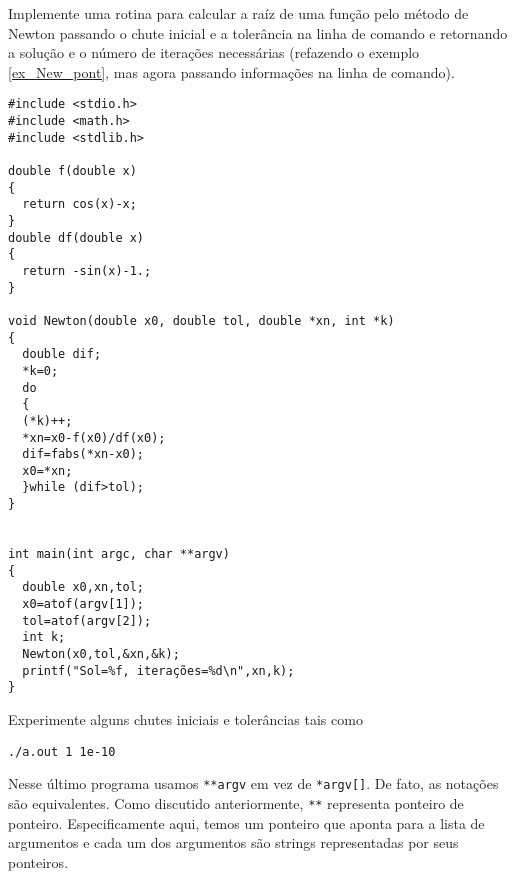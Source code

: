 \begin{ex}Implemente uma rotina para calcular a raíz de uma função pelo método de Newton passando o chute inicial e a tolerância na linha de comando e retornando a solução e o número de iterações necessárias (refazendo o exemplo \ref{ex_New_pont}, mas agora passando informações na linha de comando).
\end{ex}
\begin{verbatim}
#include <stdio.h>
#include <math.h>
#include <stdlib.h>

double f(double x)
{
  return cos(x)-x;
}
double df(double x)
{
  return -sin(x)-1.;
}

void Newton(double x0, double tol, double *xn, int *k)
{
  double dif;
  *k=0;
  do
  {
  (*k)++;
  *xn=x0-f(x0)/df(x0);
  dif=fabs(*xn-x0);
  x0=*xn;
  }while (dif>tol);
}


int main(int argc, char **argv)
{
  double x0,xn,tol;
  x0=atof(argv[1]);
  tol=atof(argv[2]);
  int k;
  Newton(x0,tol,&xn,&k);
  printf("Sol=%f, iterações=%d\n",xn,k);
}
\end{verbatim}
Experimente alguns chutes iniciais e tolerâncias tais como
\begin{verbatim}
./a.out 1 1e-10
\end{verbatim}
Nesse último programa usamos \verb|**argv| em vez de \verb|*argv[]|. De fato, as notações são equivalentes. Como discutido anteriormente, \verb|**| representa ponteiro de ponteiro. Especificamente aqui, temos um ponteiro que aponta para a lista de argumentos e cada um dos argumentos são strings representadas por seus ponteiros.
